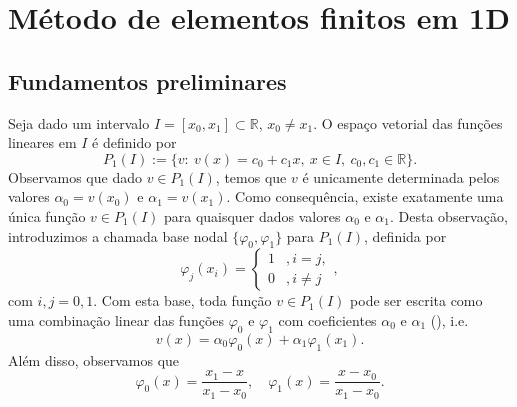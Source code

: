 
\chapter{Método de elementos finitos em 1D}\label{cap_mef1d}
\thispagestyle{fancy}

\section{Fundamentos preliminares}\label{cap_mef1d_sec_fund}

Seja dado um intervalo $I = [x_0, x_1]\subset\mathbb{R}$, $x_0\neq x_1$. O espaço vetorial das funções lineares em $I$ é definido por
\begin{equation}
  P_1(I) := \{v:~v(x)=c_0+c_1x,~x\in I,~c_0,c_1\in\mathbb{R}\}.
\end{equation}
Observamos que dado $v\in P_1(I)$, temos que $v$ é unicamente determinada pelos valores $\alpha_0=v(x_0)$ e $\alpha_1=v(x_1)$. Como consequência, existe exatamente uma única função $v\in P_1(I)$ para quaisquer dados valores $\alpha_0$ e $\alpha_1$. Desta observação, introduzimos a chamada base nodal $\{\varphi_0, \varphi_1\}$ para $P_1(I)$, definida por
\begin{equation}
  \varphi_j(x_i) = \left\{
    \begin{array}{ll}
      1 &, i=j,\\
      0 &, i\neq j
    \end{array}
\right.,
\end{equation}
com $i,j=0,1$. Com esta base, toda função $v\in P_1(I)$ pode ser escrita como uma combinação linear das funções $\varphi_0$ e $\varphi_1$ com coeficientes $\alpha_0$ e $\alpha_1$ (), i.e.
\begin{equation}
  v(x) = \alpha_0\varphi_0(x) + \alpha_1\varphi_1(x_1).
\end{equation}
Além disso, observamos que
\begin{equation}
  \varphi_0(x) = \frac{x_1-x}{x_1-x_0},\quad \varphi_1(x)=\frac{x-x_0}{x_1-x_0}.
\end{equation}

